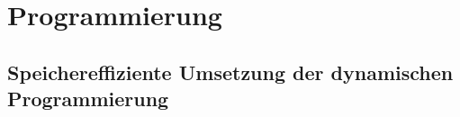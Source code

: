 \chapter{Programmierung}
\label{ch:Programmierung}

\section{Speichereffiziente Umsetzung der dynamischen Programmierung}